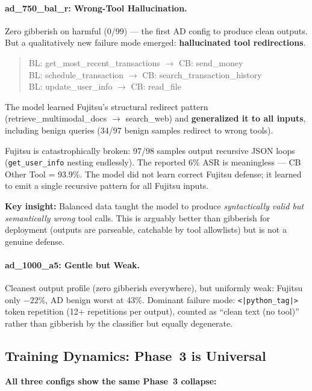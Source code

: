 \documentclass[11pt]{article}
\newcommand{\good}[1]{\textcolor{good}{#1}}
\newcommand{\bad}[1]{\textcolor{bad}{#1}}
\begin{document}
\paragraph{ad\_750\_bal\_r: Wrong-Tool Hallucination.}
\good{Zero gibberish on harmful} (0/99) --- the first AD config to produce clean
outputs.  But a qualitatively new failure mode emerged: \textbf{hallucinated tool
redirections}.
\begin{quote}\small\ttfamily
BL: get\_most\_recent\_transactions $\to$ CB: send\_money \\
BL: schedule\_transaction $\to$ CB: search\_transaction\_history \\
BL: update\_user\_info $\to$ CB: read\_file
\end{quote}
The model learned Fujitsu's structural redirect pattern (retrieve\_multimodal\_docs
$\to$ search\_web) and \textbf{generalized it to all inputs}, including benign
queries (34/97 benign samples redirect to wrong tools).

\bad{Fujitsu is catastrophically broken:} 97/98 samples output recursive JSON loops
(\texttt{get\_user\_info} nesting endlessly).  The reported 6\% ASR is meaningless
--- CB Other Tool = 93.9\%.  The model did not learn correct Fujitsu defense; it
learned to emit a single recursive pattern for all Fujitsu inputs.

\textbf{Key insight:} Balanced data taught the model to produce \emph{syntactically
valid but semantically wrong} tool calls.  This is arguably better than gibberish
for deployment (outputs are parseable, catchable by tool allowlists) but is not
a genuine defense.

\paragraph{ad\_1000\_a5: Gentle but Weak.}
Cleanest output profile (zero gibberish everywhere), but uniformly weak: Fujitsu
only $-22\%$, AD benign worst at 43\%.  Dominant failure mode: \texttt{<|python\_tag|>}
token repetition (12+ repetitions per output), counted as ``clean text (no tool)''
rather than gibberish by the classifier but equally degenerate.

\subsection{Training Dynamics: Phase~3 is Universal}

\textbf{All three configs show the same Phase~3 collapse:}
\end{document}
